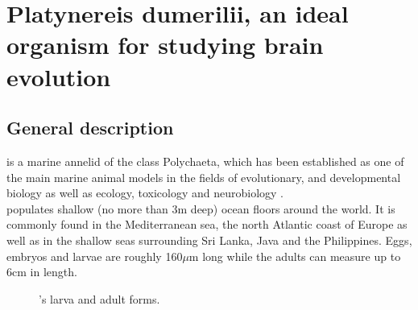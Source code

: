     
\section{Platynereis dumerilii, an ideal organism for studying brain evolution}\label{sec:platynereis}
     \subsection{General description}
     \platyfull{} is a marine annelid of the class Polychaeta, which has been established as one of the main marine animal models in the fields of evolutionary, and developmental biology as well as ecology, toxicology and neurobiology \cite{hutchinson95,tessmar03,hardege99,dorresteijn90,fischer04,Fischer10}.\\
     
     \platy{} populates shallow (no more than 3m deep) ocean floors around the world. It is commonly found in the Mediterranean sea, the north Atlantic coast of Europe as well as in the shallow seas surrounding Sri Lanka, Java and the Philippines. Eggs, embryos and larvae are roughly 160$\mu$m long while the adults can measure up to 6cm in length.
     
     
\begin{figure}[bth]
        \myfloatalign
         \quad
        \caption{\platyfull{}'s larva and adult forms.}\label{fig:platynereis}
\end{figure}
     
